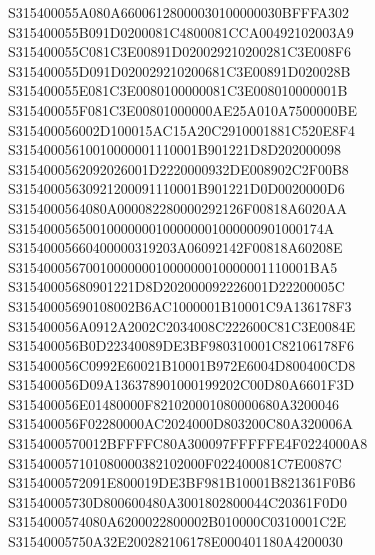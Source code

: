 \documentclass[12pt,a4paper]{article}
\begin{document}
\begin{framed}
{S315400055A080A66006128000030100000030BFFFA302\newline
S315400055B091D0200081C4800081CCA00492102003A9\newline
S315400055C081C3E00891D020029210200281C3E008F6\newline
S315400055D091D020029210200681C3E00891D020028B\newline
S315400055E081C3E0080100000081C3E008010000001B\newline
S315400055F081C3E00801000000AE25A010A7500000BE\newline
S315400056002D100015AC15A20C2910001881C520E8F4\newline
S31540005610010000001110001B901221D8D202000098\newline
S3154000562092026001D2220000932DE008902C2F00B8\newline
S31540005630921200091110001B901221D0D0020000D6\newline
S3154000564080A000082280000292126F00818A6020AA\newline
S31540005650010000000100000001000000901000174A\newline
S31540005660400000319203A06092142F00818A60208E\newline
S315400056700100000001000000010000001110001BA5\newline
S31540005680901221D8D202000092226001D22200005C\newline
S31540005690108002B6AC1000001B10001C9A136178F3\newline
S315400056A0912A2002C2034008C222600C81C3E0084E\newline
S315400056B0D22340089DE3BF980310001C82106178F6\newline
S315400056C0992E60021B10001B972E6004D800400CD8\newline
S315400056D09A136378901000199202C00D80A6601F3D\newline
S315400056E01480000F821020001080000680A3200046\newline
S315400056F02280000AC2024000D803200C80A320006A\newline
S3154000570012BFFFFC80A300097FFFFFE4F0224000A8\newline
S315400057101080000382102000F022400081C7E0087C\newline
S3154000572091E800019DE3BF981B10001B821361F0B6\newline
S31540005730D800600480A3001802800044C20361F0D0\newline
S3154000574080A6200022800002B010000C0310001C2E\newline
S31540005750A32E200282106178E000401180A4200030\newline
}
\end{framed}
\end{document}
